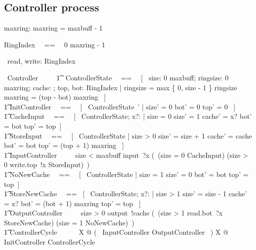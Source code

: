 \documentclass{article}
\begin{document}
\subsection{Controller process}

\begin{axdef}
  maxring: \nat
\where %
  maxring = maxbuff - 1
\end{axdef}

\begin{zed}
    RingIndex ~~==~~ 0 \upto maxring - 1
\end{zed}

\begin{circus}
   \circchannel\ read, write: RingIndex \cross \nat
\end{circus}

\begin{circus}
  \circprocess\ Controller ~~\circdef~~ \circbegin
  \also
    \t1 \circstate\ ControllerState ~~==~~ [~ size: 0 \upto maxbuff; ringsize: 0 \upto maxring; cache: \nat; top, bot: RingIndex | ringsize = max \{ 0, size - 1 \} \land ringsize \mod maxring = (top - bot) \mod maxring ~] \\
    \t1 InitController ~~==~~ [~ ControllerState~' | size' = 0 \land bot' = 0 \land top' = 0 ~] \\
    \t1 CacheInput ~~==~~ [~ \Delta ControllerState; x?: \nat | size = 0 \land size' = 1 \land cache' = x? \land bot' = bot \land top' = top~] \\
    \t1 StoreInput ~~==~~ [~ \Delta ControllerState | size > 0 \land size' = size + 1 \land cache' = cache \land bot' = bot \land top' = (top + 1) \mod maxring ~] \\
    \t1 InputController ~~\circdef~~ \lcircguard size < maxbuff \rcircguard \circguard input~?x \then (~(\lcircguard size = 0 \rcircguard \circguard CacheInput) \extchoice (\lcircguard size > 0 \rcircguard \circguard write.top~!x \then StoreInput)~) \\
    \t1 NoNewCache ~~==~~ [~ \Delta ControllerState | size = 1 \land size' = 0 \land bot' = bot \land top' = top~] \\
    \t1 StoreNewCache ~~==~ [~ \Delta ControllerState; x?: \nat | size > 1 \land size' = size - 1 \land cache' = x? bot' = (bot + 1) \mod maxring \land top' = top ~] \\
    \t1 OutputController ~~\circdef~~ \lcircguard size > 0 \rcircguard \circguard output~!cache \then (~(\lcircguard size > 1 \rcircguard \circguard read.bot~?x \then StoreNewCache) \extchoice (\lcircguard size = 1 \rcircguard \circguard NoNewCache)~) \\
    \t1 ControllerCycle ~~\circdef~~ \circmu\ X @ (~ InputController \extchoice OutputController ~) \circseq X
  \also %
   @ InitController \circseq ControllerCycle \\
  \circend
\end{circus}
\end{document}
